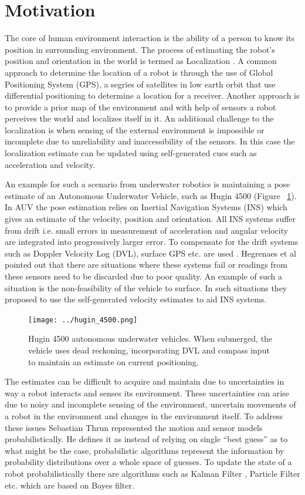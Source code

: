 \documentclass[12pt,draft]{dalcsthesis}
\begin{document}
\section{Motivation}
The core of human environment interaction is the ability of a person to know its position in surrounding environment. The process of estimating the robot’s position and orientation in the world is termed as Localization \cite{thrun2005probabilistic}.  A common approach to determine the location of a robot is through the use of Global Positioning System (GPS), a segries of satellites in low earth orbit that use differential positioning to determine a location for a receiver.  Another approach is to provide a prior map of the environment and with help of sensors a robot perceives the world and localizes itself in it. An additional challenge to the localization is when sensing of the external environment is impossible or incomplete due to unreliability and inaccessibility of the sensors. In this case the localization estimate can be updated using self-generated cues such as acceleration and velocity.  

An example for such a scenario from underwater robotics is maintaining a pose estimate of an Autonomous Underwater Vehicle, such as Hugin 4500 (Figure ~\ref{fig-Hugin 4500}). In AUV the pose estimation relies on Inertial Navigation Systems (INS) which gives an estimate of the velocity, position and orientation.  All INS systems suffer from drift i.e. small errors in measurement of acceleration and angular velocity are integrated into progressively larger error.  To compensate for the drift systems such as Doppler Velocity Log (DVL), surface GPS etc. are used \cite{Lammas2004} \cite{leonard1998autonomous}. Hegrenaes et al \cite{Hegrenes2008} pointed out that there are situations where these systems fail or readings from these sensors need to be discarded due to poor quality.  An example of such a situation is the non-feasibility of the vehicle to surface.  In such situations they proposed to use the self-generated velocity estimates to aid INS systems. 
\begin{figure}
  \centering
     {\texttt{[image: ../hugin\_4500.png]}}
  \caption{\label{fig-Hugin 4500} Hugin 4500 autonomous underwater vehicles. When submerged, the vehicle uses dead reckoning, incorporating DVL and compass input to maintain an estimate on current positioning.
}
\end{figure}


The estimates can be difficult to acquire and maintain due to uncertainties in way a robot interacts and senses its environment. These uncertainties can arise due to noisy and incomplete sensing of the environment, uncertain movements of a robot in the environment and changes in the environment itself.  To address these issues Sebastian Thrun \cite{thrun2005probabilistic} represented the motion and sensor models probabilistically. He defines it as instead of relying on single “best guess” as to what might be the case, probabilistic algorithms represent the information by probability distributions over a whole space of guesses.  To update the state of a robot probabilistically there are algorithms such as Kalman Filter \cite{kalman1960new}, Particle Filter \cite{gordon1993novel} etc. which are based on Bayes filter. 
\end{document}
